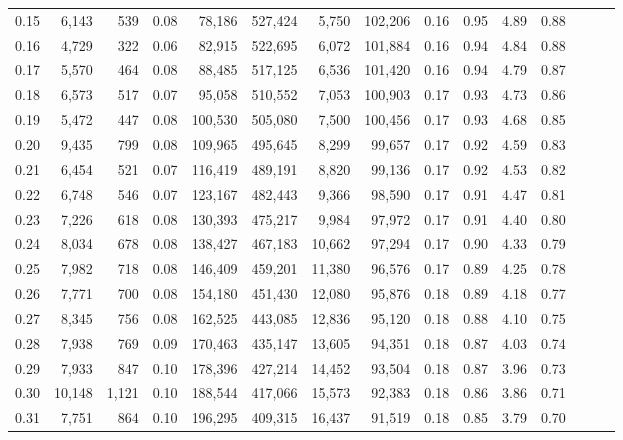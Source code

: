 \begin{tabular}{rrrrrrrrrrrrrrr}
0.15 &   6,143 &    539 &  0.08 &   78,186 &  527,424 &    5,750 &  102,206 &  0.16 &  0.95 &  4.89 &      0.88 \\
0.16 &   4,729 &    322 &  0.06 &   82,915 &  522,695 &    6,072 &  101,884 &  0.16 &  0.94 &  4.84 &      0.88 \\
0.17 &   5,570 &    464 &  0.08 &   88,485 &  517,125 &    6,536 &  101,420 &  0.16 &  0.94 &  4.79 &      0.87 \\
0.18 &   6,573 &    517 &  0.07 &   95,058 &  510,552 &    7,053 &  100,903 &  0.17 &  0.93 &  4.73 &      0.86 \\
0.19 &   5,472 &    447 &  0.08 &  100,530 &  505,080 &    7,500 &  100,456 &  0.17 &  0.93 &  4.68 &      0.85 \\
0.20 &   9,435 &    799 &  0.08 &  109,965 &  495,645 &    8,299 &   99,657 &  0.17 &  0.92 &  4.59 &      0.83 \\
0.21 &   6,454 &    521 &  0.07 &  116,419 &  489,191 &    8,820 &   99,136 &  0.17 &  0.92 &  4.53 &      0.82 \\
0.22 &   6,748 &    546 &  0.07 &  123,167 &  482,443 &    9,366 &   98,590 &  0.17 &  0.91 &  4.47 &      0.81 \\
0.23 &   7,226 &    618 &  0.08 &  130,393 &  475,217 &    9,984 &   97,972 &  0.17 &  0.91 &  4.40 &      0.80 \\
0.24 &   8,034 &    678 &  0.08 &  138,427 &  467,183 &   10,662 &   97,294 &  0.17 &  0.90 &  4.33 &      0.79 \\
0.25 &   7,982 &    718 &  0.08 &  146,409 &  459,201 &   11,380 &   96,576 &  0.17 &  0.89 &  4.25 &      0.78 \\
0.26 &   7,771 &    700 &  0.08 &  154,180 &  451,430 &   12,080 &   95,876 &  0.18 &  0.89 &  4.18 &      0.77 \\
0.27 &   8,345 &    756 &  0.08 &  162,525 &  443,085 &   12,836 &   95,120 &  0.18 &  0.88 &  4.10 &      0.75 \\
0.28 &   7,938 &    769 &  0.09 &  170,463 &  435,147 &   13,605 &   94,351 &  0.18 &  0.87 &  4.03 &      0.74 \\
0.29 &   7,933 &    847 &  0.10 &  178,396 &  427,214 &   14,452 &   93,504 &  0.18 &  0.87 &  3.96 &      0.73 \\
0.30 &  10,148 &  1,121 &  0.10 &  188,544 &  417,066 &   15,573 &   92,383 &  0.18 &  0.86 &  3.86 &      0.71 \\
0.31 &   7,751 &    864 &  0.10 &  196,295 &  409,315 &   16,437 &   91,519 &  0.18 &  0.85 &  3.79 &      0.70 \\

\end{tabular}
